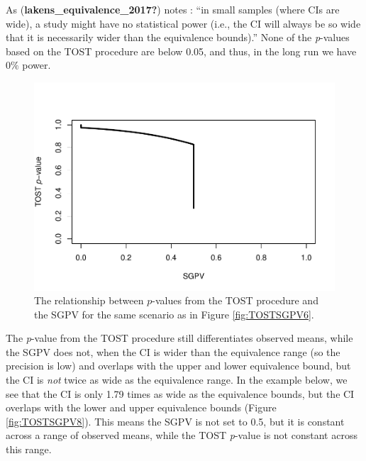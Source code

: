 \documentclass[
  english,
  man]{apa6}
\begin{document}
As (\textbf{lakens\_equivalence\_2017?}) notes : ``in small samples (where CIs are wide), a study might have no statistical power (i.e., the CI will always be so wide that it is necessarily wider than the equivalence bounds).'' None of the \emph{p}-values based on the TOST procedure are below 0.05, and thus, in the long run we have 0\(\%\) power.

\begin{figure}

{\centering \includegraphics[height=0.94\textheight]{chp5_format-Rmd_bib_files/figure-latex/TOSTSGPV7-1} 

}

\caption{The relationship between $p$-values from the TOST procedure and the SGPV for the same scenario as in Figure \ref{fig:TOSTSGPV6}.}\label{fig:TOSTSGPV7}
\end{figure}

The \emph{p}-value from the TOST procedure still differentiates observed means, while the SGPV does not, when the CI is wider than the equivalence range (so the precision is low) and overlaps with the upper and lower equivalence bound, but the CI is \emph{not} twice as wide as the equivalence range. In the example below, we see that the CI is only 1.79 times as wide as the equivalence bounds, but the CI overlaps with the lower and upper equivalence bounds (Figure \ref{fig:TOSTSGPV8}). This means the SGPV is not set to 0.5, but it is constant across a range of observed means, while the TOST \emph{p}-value is not constant across this range.
\end{document}
